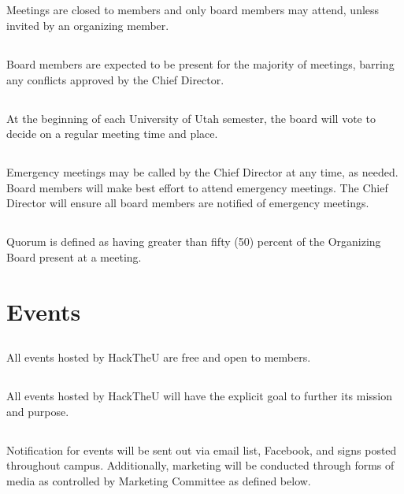 \documentclass[12pt]{article}
\begin{document}
\subsection{} Meetings are closed to members and only board members may attend, unless invited by an organizing member.
\subsection{} Board members are expected to be present for the majority of meetings, 
barring any conflicts approved by the Chief Director.
\subsection{} At the beginning of each University of Utah semester, the board will vote to decide on a regular meeting time and place.
\subsection{} Emergency meetings may be called by the Chief Director at any time, as needed.
Board members will make best effort to attend emergency meetings.
The Chief Director will ensure all board members are notified of emergency meetings.
\subsection{} Quorum is defined as having greater than fifty (50) percent of the Organizing Board present at a meeting.

\section{Events}

\subsection{} All events hosted by HackTheU are free and open to members.
\subsection{} All events hosted by HackTheU will have the explicit goal to further its mission and purpose.
\subsection{} Notification for events will be sent out via email list, Facebook, and signs posted throughout campus. 
Additionally, marketing will be conducted through forms of media as controlled by
Marketing Committee as defined below.
\end{document}
